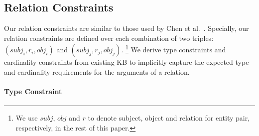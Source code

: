 

\subsection{Relation Constraints}
\label{sec:constraints}



Our relation constraints are similar to those used by  Chen et al.~.
Specially,
our relation constraints are defined over each combination of two triples: $(subj_i, r_i, obj_i)$ and $(subj_j,  r_j, obj_j)$.
\footnote{We use $subj$, $obj$ and $r$ to denote subject, object and relation for entity pair, respectively, in the rest of this paper.}
We derive type constraints and cardinality constraints from existing KB to implicitly capture the expected type and cardinality requirements for the arguments of a relation.


\paragraph{Type Constraint}


